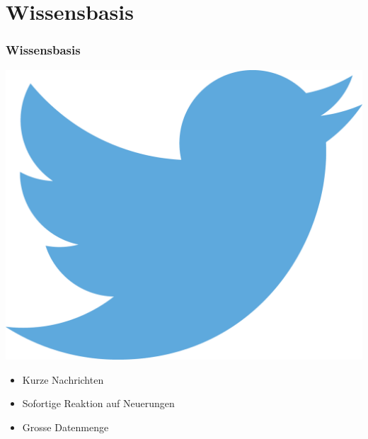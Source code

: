 \documentclass{beamer}
\begin{document}
\section{Wissensbasis}
\begin{frame}
  \frametitle{Wissensbasis} \pause
  \begin{minipage}{.4\textwidth}
    \includegraphics[height=.4\textheight]{Twitter_logo_blue} \pause
  \end{minipage}%
  \hfill
  \begin{minipage}{.6\textwidth}
    \begin{itemize}
      \item Kurze Nachrichten \pause
      \item Sofortige Reaktion auf Neuerungen \pause
      \item Grosse Datenmenge
    \end{itemize}
  \end{minipage}
\end{frame}
\end{document}
